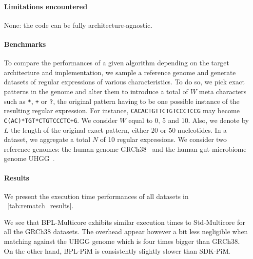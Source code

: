 \paragraph{Limitations encountered}

None: the code can be fully architecture-agnostic.

\paragraph{Benchmarks}

To compare the performances of a given algorithm depending on the target architecture and implementation, we sample a reference genome and generate datasets of regular expressions of various characteristics.
To do so, we pick exact patterns in the genome and alter them to introduce a total of $W$ meta characters such as \texttt{*}, \texttt{+} or \texttt{?}, the original pattern having to be one possible instance of the resulting regular expression.
For instance, \texttt{CACACTGTTCTGTCCCTCCG} may become \texttt{C(AC)*TGT*CTGTCCCTC+G}.
We consider $W$ equal to 0, 5 and 10.
Also, we denote by $L$ the length of the original exact pattern, either 20 or 50 nucleotides.
In a dataset, we aggregate a total $N$ of 10 regular expressions.
We consider two reference genomes: the human genome GRCh38~\cite{HG38} and the human gut microbiome genome UHGG~\cite{UHGG}.

\paragraph{Results} We present the execution time performances of all datasets in \tablename~\ref{tab:rematch_results}.

We see that BPL-Multicore exhibits similar execution times to Std-Multicore for all the GRCh38 datasets.
The overhead appear however a bit less negligible when matching against the UHGG genome which is four times bigger than GRCh38.
On the other hand, BPL-PiM is consistently slightly slower than SDK-PiM.


